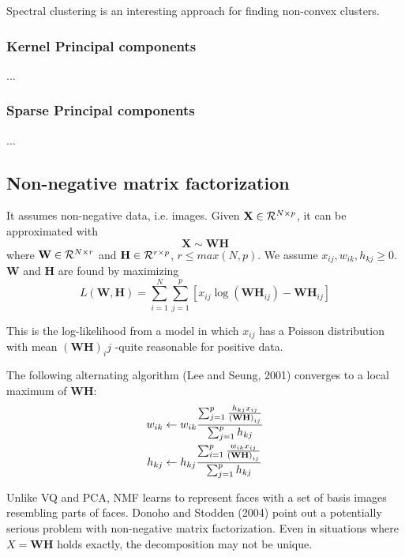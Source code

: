 \documentclass[12pt, letterpaper]{article}
\theoremstyle{definition}
\newcommand{\X}{\mathrm{\mathbf{X}}}
\DeclarePairedDelimiter\autobracket{(}{)}
\newcommand{\br}[1]{\autobracket*{#1}}
\begin{document}
Spectral clustering is an interesting approach for finding non-convex clusters. 
\subsubsection{Kernel Principal components}
...

\subsubsection{Sparse Principal components}
...
\subsection{Non-negative matrix factorization}
It assumes non-negative data, i.e. images. Given $\X \in \CMcal{R}^{N\times p}$, it can be approximated with
\begin{equation}
\X \sim \mathbf{W}\mathbf{H}
\end{equation}
where $\mathbf{W} \in \CMcal{R}^{N\times r}$ and $\mathbf{H} \in \CMcal{R}^{r\times p}$, $r\le max(N,p)$. We assume $x_{ij}, w_{ik}, h_{kj}\ge 0$. $\mathbf{W}$ and $\mathbf{H}$ are found by maximizing
\begin{equation}
L(\mathbf{W}, \mathbf{H}) = \sum_{i=1}^N\sum_{j=1}^p \left[ x_{ij}\log(\mathbf{WH}_{ij}) - \mathbf{WH}_{ij} \right]
\end{equation}

This is the log-likelihood from a model in which $x_{ij}$ has a Poisson distribution with mean $(\mathbf{WH})_ij$ -quite reasonable for positive data.

The following alternating algorithm (Lee and Seung, 2001) converges to a local maximum of $\mathbf{WH}$:
\begin{equation}
\begin{aligned}
w_{ik} &\leftarrow w_{ik}\frac{\sum_{j=1}^p \frac{h_{kj} x_{ij}}{\br{\mathbf{WH}}_{ij}}}{\sum_{j=1}^p h_{kj}}\\
h_{kj} &\leftarrow  h_{kj}\frac{\sum_{i=1}^p  \frac{w_{ik}x_{ij}}{\br{\mathbf{WH}}_{ij}}} {\sum_{j=1}^p h_{kj}}
\end{aligned}
\end{equation}

Unlike VQ and PCA, NMF learns to represent faces with a set of basis images resembling parts of faces.
Donoho and Stodden (2004) point out a potentially serious problem with non-negative matrix factorization. Even in situations where $X = \mathbf{WH}$ holds exactly, the decomposition may not be unique.
\end{document}
